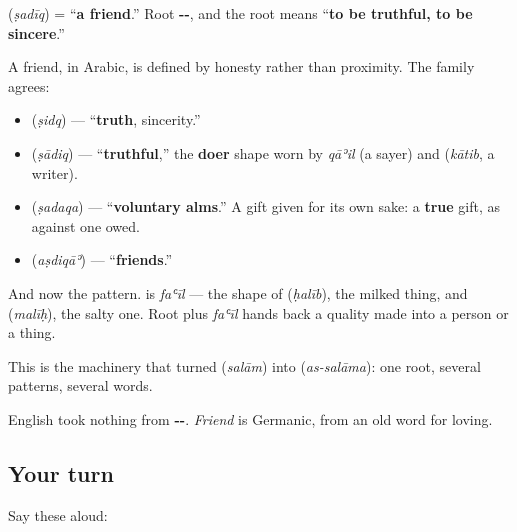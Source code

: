 \begin{cousinweb}
\textbf{} (\emph{ṣadīq}) = \textquotedblleft{}\textbf{a friend}.\textquotedblright{} Root \textbf{--}, and the root means \textquotedblleft{}\textbf{to be truthful, to be sincere}.\textquotedblright{}

A friend, in Arabic, is defined by honesty rather than proximity. The family agrees:

\begin{itemize}
\raggedright
  \item \textbf{} (\emph{ṣidq}) — \textquotedblleft{}\textbf{truth}, sincerity.\textquotedblright{}
  \item \textbf{} (\emph{ṣādiq}) — \textquotedblleft{}\textbf{truthful},\textquotedblright{} the \textbf{doer} shape worn by \emph{qāʾil} (a sayer) and \textbf{} (\emph{kātib}, a writer).
  \item \textbf{} (\emph{ṣadaqa}) — \textquotedblleft{}\textbf{voluntary alms}.\textquotedblright{} A gift given for its own sake: a \textbf{true} gift, as against one owed.
  \item \textbf{} (\emph{aṣdiqāʾ}) — \textquotedblleft{}\textbf{friends}.\textquotedblright{}
\end{itemize}

And now the pattern. \textbf{} is \emph{faʿīl} — the shape of \textbf{} (\emph{ḥalīb}), the milked thing, and \textbf{} (\emph{malīḥ}), the salty one. Root plus \emph{faʿīl} hands back a quality made into a person or a thing.

This is the machinery that turned \textbf{} (\emph{salām}) into \textbf{} (\emph{as-salāma}): one root, several patterns, several words.

English took nothing from \textbf{--}. \emph{Friend} is Germanic, from an old word for loving.
\end{cousinweb}

\subsection*{Your turn}
Say these aloud:

